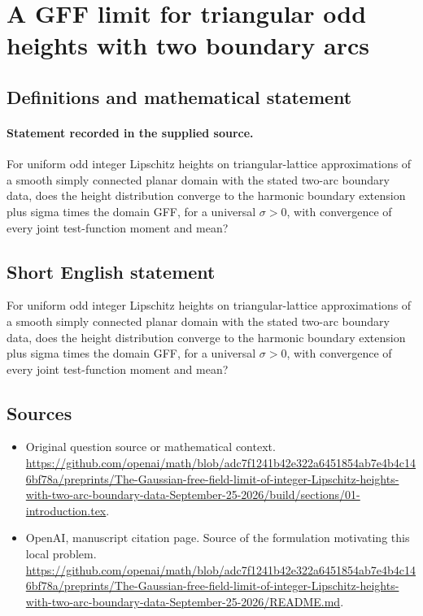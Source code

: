 \documentclass[11pt]{article}
\begin{document}
\section*{A GFF limit for triangular odd heights with two boundary arcs}\label{30007380}
\subsection{Definitions and mathematical statement}
\paragraph{Statement recorded in the supplied source.}
For uniform odd integer Lipschitz heights on triangular-lattice approximations of a smooth simply connected planar domain with the stated two-arc boundary data, does the height distribution converge to the harmonic boundary extension plus sigma times the domain GFF, for a universal $\sigma >0$, with convergence of every joint test-function moment and mean?
\subsection{Short English statement}
For uniform odd integer Lipschitz heights on triangular-lattice approximations of a smooth simply connected planar domain with the stated two-arc boundary data, does the height distribution converge to the harmonic boundary extension plus sigma times the domain GFF, for a universal $\sigma >0$, with convergence of every joint test-function moment and mean?
\subsection{Sources}
\begin{itemize}
\item[S1] Original question source or mathematical context.
\url{https://github.com/openai/math/blob/adc7f1241b42e322a6451854ab7e4b4c146bf78a/preprints/The-Gaussian-free-field-limit-of-integer-Lipschitz-heights-with-two-arc-boundary-data-September-25-2026/build/sections/01-introduction.tex}.
\item[S2] OpenAI, manuscript citation page. Source of the formulation motivating this local problem.
\url{https://github.com/openai/math/blob/adc7f1241b42e322a6451854ab7e4b4c146bf78a/preprints/The-Gaussian-free-field-limit-of-integer-Lipschitz-heights-with-two-arc-boundary-data-September-25-2026/README.md}.
\end{itemize}
\end{document}
